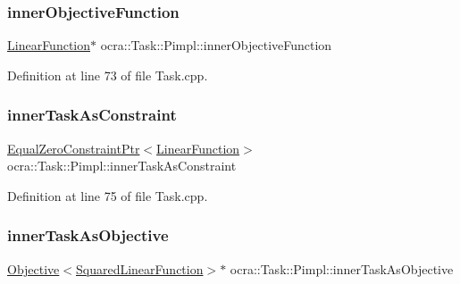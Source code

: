 \hypertarget{structocra_1_1Task_1_1Pimpl_a1af1ebecf090dacfa6f25164857b2437}{}\label{structocra_1_1Task_1_1Pimpl_a1af1ebecf090dacfa6f25164857b2437} 
\subsubsection{\texorpdfstring{inner\+Objective\+Function}{innerObjectiveFunction}}
{\footnotesize\ttfamily \hyperlink{classocra_1_1LinearFunction}{Linear\+Function}$\ast$ ocra\+::\+Task\+::\+Pimpl\+::inner\+Objective\+Function}



Definition at line 73 of file Task.\+cpp.

\hypertarget{structocra_1_1Task_1_1Pimpl_ae4b95f72f96a2740186e49920e7672ad}{}\label{structocra_1_1Task_1_1Pimpl_ae4b95f72f96a2740186e49920e7672ad} 
\subsubsection{\texorpdfstring{inner\+Task\+As\+Constraint}{innerTaskAsConstraint}}
{\footnotesize\ttfamily \hyperlink{classocra_1_1EqualZeroConstraintPtr}{Equal\+Zero\+Constraint\+Ptr}$<$\hyperlink{classocra_1_1LinearFunction}{Linear\+Function}$>$ ocra\+::\+Task\+::\+Pimpl\+::inner\+Task\+As\+Constraint}



Definition at line 75 of file Task.\+cpp.

\hypertarget{structocra_1_1Task_1_1Pimpl_a8b5dfe1995ff26df2c0505195da5c305}{}\label{structocra_1_1Task_1_1Pimpl_a8b5dfe1995ff26df2c0505195da5c305} 
\subsubsection{\texorpdfstring{inner\+Task\+As\+Objective}{innerTaskAsObjective}}
{\footnotesize\ttfamily \hyperlink{classocra_1_1Objective}{Objective}$<$\hyperlink{classocra_1_1SquaredLinearFunction}{Squared\+Linear\+Function}$>$$\ast$ ocra\+::\+Task\+::\+Pimpl\+::inner\+Task\+As\+Objective}




